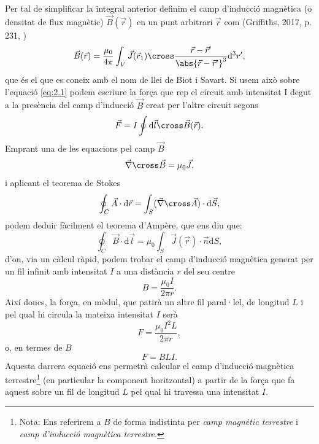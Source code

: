 \documentclass[a4paper,10.5pt]{report}
\begin{document}
Per tal de simplificar la integral anterior definim el camp d'inducció magnètica (o densitat de flux magnètic) $\vec{B}(\vec{r})$ en un punt arbitrari $\vec{r}$ com (Griffiths, 2017, p. 231, \cite{ref4})
\begin{equation}
	\vec{B}(\vec{r}) = \frac{\mu_0}{4\pi} \int_V \vec{J}(\vec{r}_1)\cross\frac{\vec{r}-\vec{r}'}{\abs{\vec{r}-\vec{r}'}^3}\mathrm{d}^3r',
\end{equation}
que és el que es coneix amb el nom de llei de Biot i Savart. 
Si usem això sobre l'equació \eqref{eq:2.1} podem escriure la força que rep el circuit amb intensitat I degut a la presència del camp d'inducció $\vec{B}$ creat per l'altre circuit segons
\begin{equation}
	\vec{F} = I \oint \mathrm{d}\vec{l}\cross\vec{B}(\vec{r}). \label{eq2:3}
\end{equation}
Emprant una de les equacions pel camp $\vec{B}$
\begin{equation}
	\vec{\nabla}\cross \vec{B} = \mu_0 \vec{J},
\end{equation}
i aplicant el teorema de Stokes
\begin{equation}
	\oint_C \vec{A} \cdot \mathrm{d}\vec{r} = \int_S (\vec{\nabla}\cross \vec{A})\cdot \mathrm{d}\vec{S},
\end{equation}
podem deduir fàcilment el teorema d'Ampère, que ens diu que:
\begin{equation}
	\oint_C\vec{B}\cdot\mathrm{d}\vec{l} = \mu_0\int_S\vec{J}(\vec{r})\cdot\vec{n}\mathrm{d}S,
	\label{eq2:6}
\end{equation}
d'on, via un càlcul ràpid, podem trobar el camp d'inducció magnètica generat per un fil infinit amb intensitat $I$ a una distància $r$ del seu centre
\begin{equation}
	B = \frac{\mu_0 I}{2\pi r}. \label{eq2:7}
\end{equation}
Així doncs, la força, en mòdul, que patirà un altre fil paral·lel, de longitud $L$  i pel qual hi circula la mateixa intensitat $I$ serà
\begin{equation}
	F = \frac{\mu_0 I^2L}{2\pi r}, \label{eq2:8}
\end{equation} 
o, en termes de $B$
\begin{equation}
	F = BLI. \label{eq:2.campmagnetic}
\end{equation}
Aquesta darrera equació ens permetrà calcular el camp d'inducció magnètica terrestre\footnote{Nota: Ens referirem a $B$ de forma indistinta per \textit{camp magnètic terrestre} i \textit{camp d'inducció magnètica terrestre}.} (en particular la component horitzontal) a partir de la força que fa aquest sobre un fil de longitud $L$ pel qual hi travessa una intensitat $I$.
\end{document}
